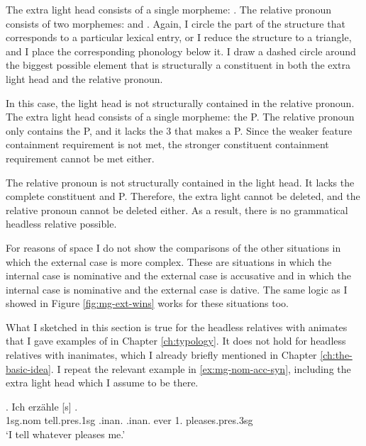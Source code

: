 The extra light head consists of a single morpheme: .
The relative pronoun consists of two morphemes:  and .
Again, I circle the part of the structure that corresponds to a particular lexical entry, or I reduce the structure to a triangle, and I place the corresponding phonology below it.
I draw a dashed circle around the biggest possible element that is structurally a constituent in both the extra light head and the relative pronoun.

In this case, the light head is not structurally contained in the relative pronoun.
The extra light head consists of a single morpheme: the P.
The relative pronoun only contains the P, and it lacks the 3 that makes a P. Since the weaker feature containment requirement is not met, the stronger constituent containment requirement cannot be met either.

The relative pronoun is not structurally contained in the light head. It lacks the complete constituent and P.
Therefore, the extra light cannot be deleted, and the relative pronoun cannot be deleted either.
As a result, there is no grammatical headless relative possible.

For reasons of space I do not show the comparisons of the other situations in which the external case is more complex. These are situations in which the internal case is nominative and the external case is accusative and in which the internal case is nominative and the external case is dative. The same logic as I showed in Figure \ref{fig:mg-ext-wins} works for these situations too.

What I sketched in this section is true for the headless relatives with animates that I gave examples of in Chapter \ref{ch:typology}. It does not hold for headless relatives with inanimates, which I already briefly mentioned in Chapter \ref{ch:the-basic-idea}. I repeat the relevant example in \ref{ex:mg-nom-acc-syn}, including the extra light head which I assume to be there.

\exg. Ich erzähle [s]    .\\
 1\ac{sg}.\ac{nom} tell.\ac{pres}.1\ac{sg}\scsub{[acc]} .\ac{inan}. .\ac{inan}. ever 1. pleases.\ac{pres}.3\ac{sg}\scsub{[nom]}\\
 `I tell whatever pleases me.' \label{ex:mg-nom-acc-syn}

